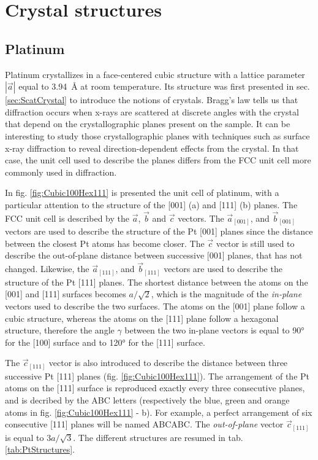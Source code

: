 \section{Crystal structures}\label{sec:Structures}

\subsection{Platinum}

Platinum crystallizes in a face-centered cubic structure with a lattice parameter $|\vec{a}|$ equal to \qty{3.94}{\angstrom} at room temperature.
Its structure was first presented in sec. \ref{sec:ScatCrystal} to introduce the notions of crystals.
Bragg's law tells us that diffraction occurs when x-rays are scattered at discrete angles with the crystal that depend on the crystallographic planes present on the sample.
It can be interesting to study those crystallographic planes with techniques such as surface x-ray diffraction to reveal direction-dependent effects from the crystal.
In that case, the unit cell used to describe the planes differs from the FCC unit cell more commonly used in diffraction.

In fig. \ref{fig:Cubic100Hex111} is presented the unit cell of platinum, with a particular attention to the structure of the [001] (a) and [111] (b) planes.
The FCC unit cell is described by the $\vec{a}$, $\vec{b}$ and $\vec{c}$ vectors.
The $\vec{a}_{[001]}$, and $\vec{b}_{[001]}$ vectors are used to describe the structure of the Pt [001] planes since the distance between the closest Pt atoms has become closer.
The $\vec{c}$ vector is still used to describe the out-of-plane distance between successive [001] planes, that has not changed.
Likewise, the $\vec{a}_{[111]}$, and $\vec{b}_{[111]}$ vectors are used to describe the structure of the Pt [111] planes.
The shortest distance between the atoms on the [001] and [111] surfaces becomes $a/\sqrt{2}$, which is the magnitude of the \textit{in-plane} vectors used to describe the two surfaces.
The atoms on the [001] plane follow a cubic structure, whereas the atoms on the [111] plane follow a hexagonal structure, therefore the angle $\gamma$ between the two in-plane vectors is equal to \ang{90} for the [100] surface and to \ang{120} for the [111] surface.

The $\vec{c}_{[111]}$ vector is also introduced to describe the distance between three successive Pt [111] planes (fig. \ref{fig:Cubic100Hex111}).
The arrangement of the Pt atoms on the [111] surface is reproduced exactly every three consecutive planes, and is decribed by the ABC letters (respectively the blue, green and orange atoms in fig. \ref{fig:Cubic100Hex111} - b).
For example, a perfect arrangement of six consecutive [111] planes will be named ABCABC.
The \textit{out-of-plane} vector $\vec{c}_{[111]}$ is equal to $3a/\sqrt{3}$.
The different structures are resumed in tab. \ref{tab:PtStructures}.

